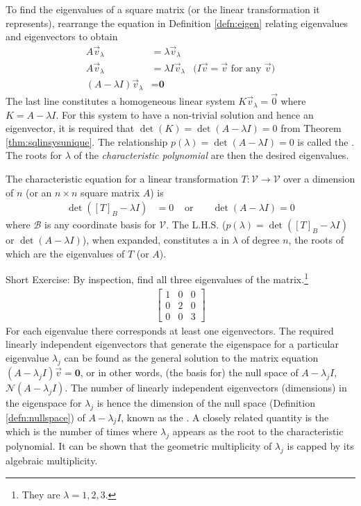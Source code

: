 To find the eigenvalues of a square matrix (or the linear transformation it represents), rearrange the equation in Definition \ref{defn:eigen} relating eigenvalues and eigenvectors to obtain
\begin{align*}
A\vec{v}_\lambda &= \lambda\vec{v}_\lambda \\
A\vec{v}_\lambda &= \lambda I\vec{v}_\lambda  &\text{($I\vec{v} = \vec{v}$ for any $\vec{v}$)} \\
(A-\lambda I)\vec{v}_\lambda &= \textbf{0}
\end{align*}
The last line constitutes a homogeneous linear system $K\vec{v}_\lambda = \vec{0}$ where $K = A - \lambda I$. For this system to have a non-trivial solution and hence an eigenvector, it is required that $\det(K) = \det(A - \lambda I) = 0$ from Theorem \ref{thm:sqlinsysunique}. The relationship $p(\lambda) = \det(A - \lambda I) = 0$ is called the . The roots for $\lambda$ of the \textit{characteristic polynomial} are then the desired eigenvalues.
\begin{defn}
\label{defn:charactereqn}
The characteristic equation for a linear transformation $T: \mathcal{V} \to \mathcal{V}$ over a dimension of $n$ (or an $n \times n$ square matrix $A$) is
\begin{align*}
\det([T]_B - \lambda I) &= 0 & \text{ or } & & \det(A-\lambda I) = 0
\end{align*}
where $\mathcal{B}$ is any coordinate basis for $\mathcal{V}$. The L.H.S. ($p(\lambda) = \det([T]_B - \lambda I)$ or $\det(A-\lambda I)$), when expanded, constitutes a  in $\lambda$ of degree $n$, the roots of which are the eigenvalues of $T$ (or $A$).
\end{defn}
Short Exercise: By inspection, find all three eigenvalues of the matrix.\footnote{They are $\lambda = 1,2,3$.}
\begin{align*}
\begin{bmatrix}
1 & 0 & 0 \\
0 & 2 & 0 \\
0 & 0 & 3
\end{bmatrix}
\end{align*}
For each eigenvalue there corresponds at least one eigenvectors. The required linearly independent eigenvectors that generate the eigenspace for a particular eigenvalue $\lambda_j$ can be found as the general solution to the matrix equation $(A - \lambda_j I)\vec{v} = \textbf{0}$, or in other words, (the basis for) the null space of $A - \lambda_j I$, $\mathcal{N}(A-\lambda_j I)$. The number of linearly independent eigenvectors (dimensions) in the eigenspace for $\lambda_j$ is hence the dimension of the null space (Definition \ref{defn:nullspace}) of $A-\lambda_j I$, known as the . A closely related quantity is the  which is the number of times where $\lambda_j$ appears as the root to the characteristic polynomial. It can be shown that the geometric multiplicity of $\lambda_j$ is capped by its algebraic multiplicity.
